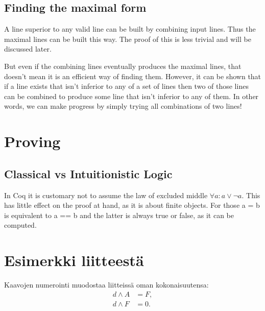 \documentclass[english, 12pt, a4paper, sci, utf8, a-1b, online]{aaltothesis}
\begin{document}
\subsection{Finding the maximal form}

A line superior to any valid line can be built by combining input lines. Thus the maximal lines can be built this way. The proof of this is less trivial and will be discussed later.

But even if the combining lines eventually produces the maximal lines, that doesn't mean it is an efficient way of finding them. However, it can be shown that if a line exists that isn't inferior to any of a set of lines then two of those lines can be combined to produce some line that isn't inferior to any of them. In other words, we can make progress by simply trying all combinations of two lines!

\section{Proving}

\subsection{Classical vs Intuitionistic Logic}

In Coq it is customary not to assume the law of excluded middle $\forall a : a \lor \lnot a$. This has little effect on the proof at hand, as it is about finite objects. For those a = b is equivalent to a == b and the latter is always true or false, as it can be computed.

\clearpage
\thesisbibliography{}




\clearpage
\thesisappendix{}

\section{Esimerkki liitteestä\label{LiiteA}}

Kaavojen numerointi muodostaa liitteissä oman kokonaisuutensa:
\begin{align}
d \wedge A &= F, \label{liitekaava1}\\
d \wedge F &= 0. \label{liitekaava2}
\end{align}
\end{document}
